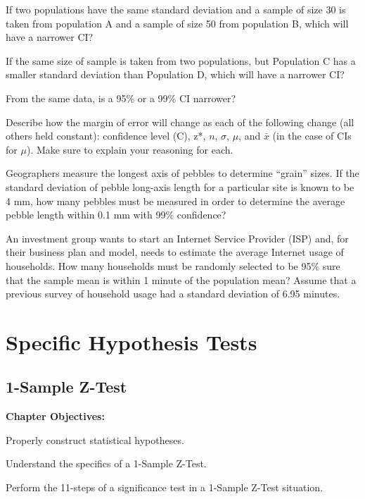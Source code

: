 \documentclass[10pt,openany]{book}\usepackage[]{graphicx}\usepackage[]{color}
\begin{document}
\begin{minipage}{\textwidth}
\begin{exsection}
  \item \label{revex:CIABn} If two populations have the same standard deviation and a sample of size 30 is taken from population A and a sample of size 50 from population B, which will have a narrower CI? 
  \item \label{revex:CIABs} If the same size of sample is taken from two populations, but Population C has a smaller standard deviation than Population D, which will have a narrower CI? 
  \item \label{revex:CIC} From the same data, is a 95\% or a 99\% CI narrower? 
  \item \label{revex:CIdescribe} Describe how the margin of error will change as each of the following change (all others held constant): confidence level (C), z*, $n$, $\sigma$, $\mu$, and $\bar{x}$ (in the case of CIs for $\mu$).  Make sure to explain your reasoning for each. 
  \item \label{revex:CIPebbles} Geographers measure the longest axis of pebbles to determine ``grain'' sizes.  If the standard deviation of pebble long-axis length for a particular site is known to be 4 mm, how many pebbles must be measured in order to determine the average pebble length within 0.1 mm with 99\% confidence? 
  \item \label{revex:CIISP} An investment group wants to start an Internet Service Provider (ISP) and, for their business plan and model, needs to estimate the average Internet usage of households.  How many households must be randomly selected to be 95\% sure that the sample mean is within 1 minute of the population mean?  Assume that a previous survey of household usage had a standard deviation of 6.95 minutes. 
\end{exsection}
\end{minipage}

    \part{Specific Hypothesis Tests}



\chapter{1-Sample Z-Test} \label{chap:ZTest}
\begin{ChapObj}{\boxwidth}
  \textbf{Chapter Objectives:}
  \begin{Enumerate}
    \item Properly construct statistical hypotheses.
    \item Understand the specifics of a 1-Sample Z-Test.
    \item Perform the 11-steps of a significance test in a 1-Sample Z-Test situation.
  \end{Enumerate}
\end{ChapObj}
\end{document}
